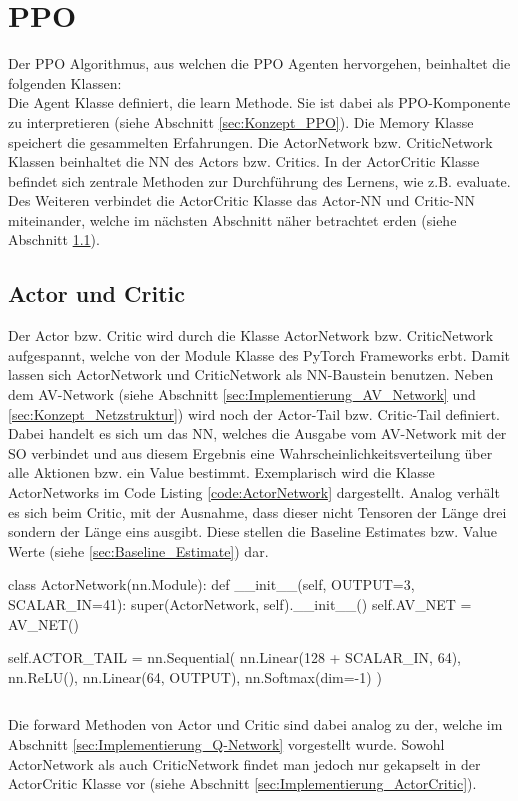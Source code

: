 \section{PPO} \label{sec:Implementierung_PPO}
Der PPO Algorithmus, aus welchen die PPO Agenten hervorgehen, beinhaltet die folgenden Klassen:\\
Die Agent Klasse definiert, die learn Methode.  Sie ist dabei als PPO-Komponente zu interpretieren (siehe Abschnitt \ref{sec:Konzept_PPO}).
Die Memory Klasse speichert die gesammelten Erfahrungen.
Die ActorNetwork bzw. CriticNetwork Klassen beinhaltet die NN des Actors bzw. Critics.
In der ActorCritic Klasse befindet sich zentrale Methoden zur Durchführung des Lernens, wie z.B. evaluate. 
Des Weiteren verbindet die ActorCritic Klasse das Actor-NN und Critic-NN miteinander, welche im nächsten Abschnitt näher betrachtet erden (siehe Abschnitt \ref{sec:Implementierung_Actor_and_Critic}).

\subsection{Actor und Critic} \label{sec:Implementierung_Actor_and_Critic}
Der Actor bzw. Critic wird durch die Klasse ActorNetwork bzw. CriticNetwork aufgespannt, welche von der Module Klasse des PyTorch Frameworks erbt. Damit lassen sich ActorNetwork und CriticNetwork als NN-Baustein benutzen.
Neben dem AV-Network (siehe Abschnitt \ref{sec:Implementierung_AV_Network} und \ref{sec:Konzept_Netzstruktur}) wird noch der Actor-Tail bzw. Critic-Tail definiert. Dabei handelt es sich um das NN, welches die Ausgabe vom AV-Network mit der SO verbindet und aus diesem Ergebnis eine Wahrscheinlichkeitsverteilung über alle Aktionen bzw. ein Value bestimmt. 
Exemplarisch wird die Klasse ActorNetworks im Code Listing \ref{code:ActorNetwork} dargestellt. Analog verhält es sich beim Critic, mit der Ausnahme, dass dieser nicht Tensoren der Länge drei sondern der Länge eins ausgibt. Diese stellen die Baseline Estimates bzw. Value Werte (siehe \ref{sec:Baseline_Estimate}) dar.
\begin{python}
class ActorNetwork(nn.Module):
	def __init__(self, OUTPUT=3, SCALAR_IN=41):
		super(ActorNetwork, self).__init__()
		self.AV_NET = AV_NET()
			
		self.ACTOR_TAIL = nn.Sequential(
			nn.Linear(128 + SCALAR_IN, 64),
			nn.ReLU(),
			nn.Linear(64, OUTPUT),
			nn.Softmax(dim=-1)
		)
\end{python}
\begin{lstlisting}[caption=ActorNetwork, label=code:ActorNetwork]
\end{lstlisting}
Die forward Methoden von Actor und Critic sind dabei analog zu der, welche im Abschnitt \ref{sec:Implementierung_Q-Network} vorgestellt wurde. 
Sowohl ActorNetwork als auch CriticNetwork findet man jedoch nur gekapselt in der ActorCritic Klasse vor (siehe Abschnitt \ref{sec:Implementierung_ActorCritic}).

